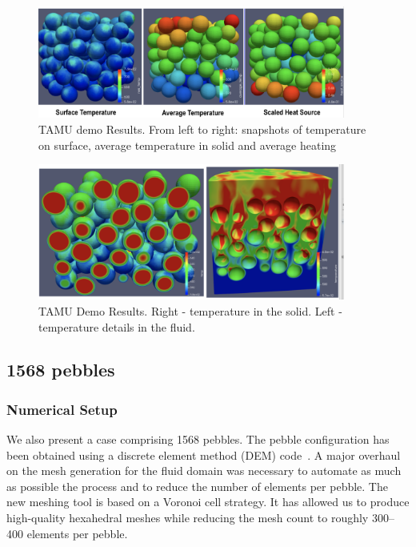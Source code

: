 \begin{figure}[!h]
\centering
\includegraphics[clip=true,width=0.9\textwidth]{Figures/demo_r1}
\caption{TAMU demo Results. From left to right: snapshots of temperature on surface, average temperature in solid and average heating}
\label{f:dtamu1}
\end{figure}

\begin{figure}[!h]
\centering
\includegraphics[clip=true,width=0.9\textwidth]{Figures/demo_r2}
\caption{TAMU Demo Results. Right - temperature in the solid. Left - temperature details in the fluid.}
\label{f:dtamu2}
\end{figure}

\subsection{1568 pebbles}

\subsubsection{Numerical Setup}

We also present a case comprising 1568 pebbles. The pebble configuration has
been obtained using a discrete element method (DEM) code~\cite{projectChronoWebSite}.
A major overhaul on the mesh generation for the fluid domain was necessary
to automate as much as possible the process and to reduce the number of elements
per pebble. The new meshing tool is based on a Voronoi cell strategy.
It has allowed us to produce high-quality hexahedral meshes while reducing the mesh
count to roughly 300--400 elements per pebble.

